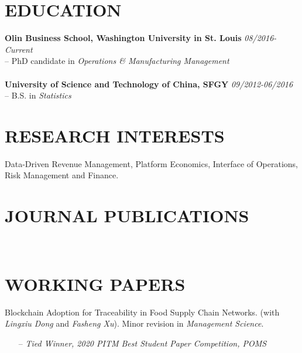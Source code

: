 \documentclass[margin, 10pt]{res} %
\begin{document}
\begin{resume}



\section{\textbf{EDUCATION}}
{\bf Olin Business School, Washington University in St. Louis} \hfill {\em 08/2016-Current} \\ 
-- PhD candidate in {\it Operations \& Manufacturing Management} \\
~
\\
{\bf University of Science and Technology of China, SFGY} \hfill {\em 09/2012-06/2016} \\ 
-- B.S. in {\it Statistics}\\
 
\section{RESEARCH INTERESTS} 
Data-Driven Revenue Management, Platform Economics, Interface of Operations, Risk Management and Finance.
 
\section{JOURNAL PUBLICATIONS}
~

\section{WORKING PAPERS}
Blockchain Adoption for Traceability in Food Supply Chain Networks. (with {\it Lingxiu Dong} and {\it Fasheng Xu}).
Minor revision in \textit{Management Science}. 
\begin{itemize}
    \item[--] {\it Tied Winner, 2020 PITM Best Student Paper Competition, POMS}
\end{itemize}


\end{resume}
\end{document}
